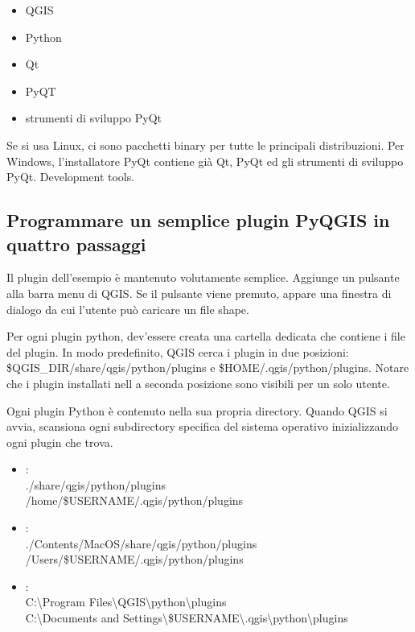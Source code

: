 \begin{itemize}
\item QGIS
\item Python
\item Qt
\item PyQT
\item strumenti di sviluppo PyQt
\end{itemize}

Se si usa Linux, ci sono pacchetti binary per tutte le principali distribuzioni. Per Windows, l'installatore PyQt contiene già Qt, PyQt ed gli strumenti di sviluppo PyQt.
Development tools.

\subsection{Programmare un semplice plugin PyQGIS in quattro passaggi}\label{subsec:pyfoursteps}

Il plugin dell'esempio è mantenuto volutamente semplice. Aggiunge un pulsante alla barra menu di QGIS. Se il pulsante viene premuto, appare una finestra di dialogo da cui l'utente può caricare un file shape.

Per ogni plugin python, dev'essere creata una cartella dedicata che contiene i file del plugin. In modo predefinito, QGIS cerca i plugin in due posizioni: \$QGIS\_DIR/share/qgis/python/plugins e \$HOME/.qgis/python/plugins.
Notare che i plugin installati nell a seconda posizione sono visibili per un solo utente.


Ogni plugin Python è contenuto nella sua propria directory. Quando QGIS si avvia, scansiona ogni subdirectory specifica del sistema operativo inizializzando ogni plugin che trova.

\begin{itemize}
\item {}:\\
./share/qgis/python/plugins \\
/home/\$USERNAME/.qgis/python/plugins
\item {}:\\
./Contents/MacOS/share/qgis/python/plugins \\
/Users/\$USERNAME/.qgis/python/plugins
\item {}:\\
C:\textbackslash Program Files\textbackslash QGIS\textbackslash python\textbackslash plugins \\
C:\textbackslash Documents and Settings\textbackslash\$USERNAME\textbackslash .qgis\textbackslash python\textbackslash plugins

\end{itemize}


